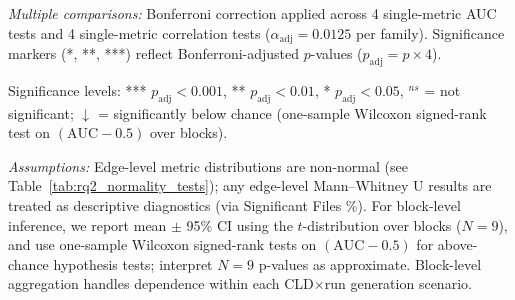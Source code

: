 \begin{table}[H]
\begin{minipage}{\linewidth}
\begin{threeparttable}
\begin{tablenotes}
\item \textit{Multiple comparisons:} Bonferroni correction applied across 4 single-metric AUC tests and 4 single-metric correlation tests ($\alpha_{\text{adj}} = 0.0125$ per family). Significance markers (*, **, ***) reflect Bonferroni-adjusted $p$-values ($p_{\text{adj}} = p \times 4$).
\item Significance levels: *** $p_{\text{adj}}<0.001$, ** $p_{\text{adj}}<0.01$, * $p_{\text{adj}}<0.05$, $^{ns}$ = not significant; $\downarrow$ = significantly below chance (one-sample Wilcoxon signed-rank test on $(\mathrm{AUC}-0.5)$ over blocks).
\item \textit{Assumptions:} Edge-level metric distributions are non-normal (see Table~\ref{tab:rq2_normality_tests}); any edge-level Mann--Whitney U results are treated as descriptive diagnostics (via Significant Files \%). For block-level inference, we report mean $\pm$ 95\% CI using the $t$-distribution over blocks ($N=9$), and use one-sample Wilcoxon signed-rank tests on $(\mathrm{AUC}-0.5)$ for above-chance hypothesis tests; interpret $N=9$ p-values as approximate. Block-level aggregation handles dependence within each CLD$\times$run generation scenario.
\end{tablenotes}
\end{threeparttable}
\end{minipage}
\end{table}
